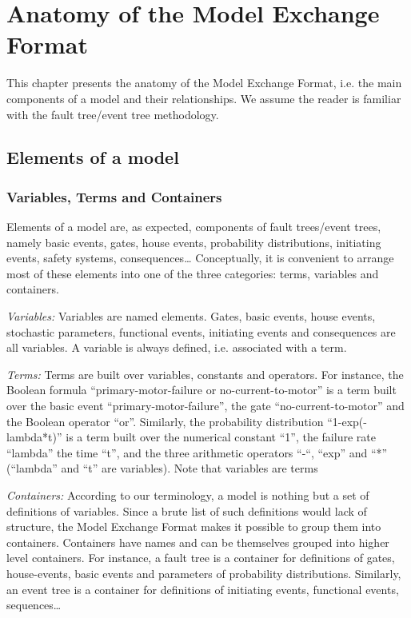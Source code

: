 \documentclass[11pt]{article}
\begin{document}
\section{Anatomy of the Model Exchange Format}
\label{sec:org18ca51f}

This chapter presents the anatomy of the Model Exchange Format, i.e. the
main components of a model and their relationships. We assume the reader
is familiar with the fault tree/event tree methodology.

\subsection{Elements of a model}
\label{sec:org81bf3fc}

\subsubsection{Variables, Terms and Containers}
\label{sec:orga26274d}

Elements of a model are, as expected, components of fault trees/event
trees, namely basic events, gates, house events, probability
distributions, initiating events, safety systems, consequences\ldots{}
Conceptually, it is convenient to arrange most of these elements into
one of the three categories: terms, variables and containers.

\emph{Variables:} Variables are named elements. Gates, basic events, house
events, stochastic parameters, functional events, initiating events and
consequences are all variables. A variable is always defined, i.e.
associated with a term.

\emph{Terms:} Terms are built over variables, constants and operators. For
instance, the Boolean formula ``primary-motor-failure or
no-current-to-motor'' is a term built over the basic event
``primary-motor-failure'', the gate ``no-current-to-motor'' and the Boolean
operator ``or''. Similarly, the probability distribution
``1-exp(-lambda*t)'' is a term built over the numerical constant ``1'', the
failure rate ``lambda'' the time ``t'', and the three arithmetic operators
``-``, ``exp'' and ``*'' (``lambda'' and ``t'' are variables). Note that variables
are terms

\emph{Containers:} According to our terminology, a model is nothing but a set
of definitions of variables. Since a brute list of such definitions
would lack of structure, the Model Exchange Format makes it possible to
group them into containers. Containers have names and can be themselves
grouped into higher level containers. For instance, a fault tree is a
container for definitions of gates, house-events, basic events and
parameters of probability distributions. Similarly, an event tree is a
container for definitions of initiating events, functional events,
sequences\ldots{}
\end{document}
